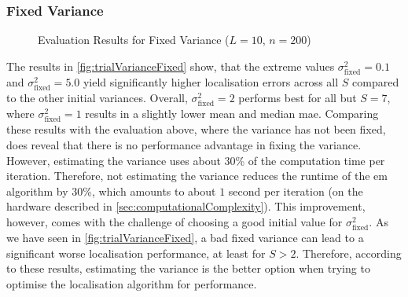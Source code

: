 \subsubsection*{Fixed Variance}

\begin{figure}[H]
\iftoggle{quick}{
    \texttt{[image: plots/boxplots/boxplot-joined-var-val]}
}{%
    
}
	\caption[Evaluation Results for Fixed Variance]{Evaluation Results for Fixed Variance ($L=10$, $n=200$)}
	\label{fig:trialVarianceFixed}
\end{figure}

The results in \autoref{fig:trialVarianceFixed} show, that the extreme values $\sigma^2_{\text{fixed}}=0.1$ and $\sigma^2_{\text{fixed}}=5.0$ yield significantly higher localisation errors across all $S$ compared to the other initial variances. Overall, $\sigma^2_{\text{fixed}}=2$ performs best for all but $S=7$, where $\sigma^2_{\text{fixed}}=1$ results in a slightly lower mean and median \gls{mae}. Comparing these results with the evaluation above, where the variance has not been fixed, does reveal that there is no performance advantage in fixing the variance. However, estimating the variance uses about 30\% of the computation time per iteration. Therefore, not estimating the variance reduces the runtime of the \gls{em} algorithm by 30\%, which amounts to about $1$ second per iteration (on the hardware described in \autoref{sec:computationalComplexity}). This improvement, however, comes with the challenge of choosing a good initial value for $\sigma^2_{\text{fixed}}$. As we have seen in \autoref{fig:trialVarianceFixed}, a bad fixed variance can lead to a significant worse localisation performance, at least for $S>2$. Therefore, according to these results, estimating the variance is the better option when trying to optimise the localisation algorithm for performance.
